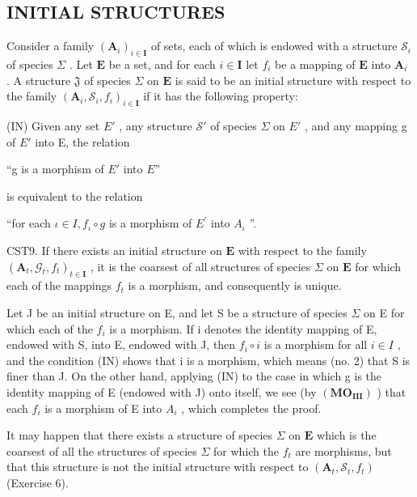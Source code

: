 \subsection{INITIAL STRUCTURES}

Consider a family \((\mathbf{A}_i)_{i\in \mathbf{I}}\) of sets, each of which is endowed with a structure \(\mathcal{S}_i\) of species \(\Sigma\) . Let \(\mathbf{E}\) be a set, and for each \(i\in \mathbf{I}\) let \(f_i\) be a mapping of \(\mathbf{E}\) into \(\mathbf{A}_i\) . A structure \(\mathfrak{J}\) of species \(\Sigma\) on \(\mathbf{E}\) is said to be an initial structure with respect to the family \((\mathbf{A}_i,\mathcal{S}_i,f_i)_{i\in \mathbf{I}}\) if it has the following property:

(IN) Given any set \(E'\) , any structure \(\mathcal{S}'\) of species \(\Sigma\) on \(E'\) , and any mapping g of \(E'\) into E, the relation

``g is a morphism of \(E'\) into \(E\)''

is equivalent to the relation

``for each \(\iota\in I,f_{\iota}\circ g\) is a morphism of \(E^{\prime}\) into \(A_{\iota}\) ''.

CST9. If there exists an initial structure on \(\mathbf{E}\) with respect to the family \((\mathbf{A}_t, \mathcal{G}_t, f_t)_{t \in \mathbf{I}}\) , it is the coarsest of all structures of species \(\Sigma\) on \(\mathbf{E}\) for which each of the mappings \(f_t\) is a morphism, and consequently is unique.

Let J be an initial structure on E, and let S be a structure of species \(\Sigma\) on E for which each of the \(f_{i}\) is a morphism. If i denotes the identity mapping of E, endowed with S, into E, endowed with J, then \(f_{i} \circ i\) is a morphism for all \(i \in I\) , and the condition (IN) shows that i is a morphism, which means (no. 2) that S is finer than J. On the other hand, applying (IN) to the case in which g is the identity mapping of E (endowed with J) onto itself, we see (by \((\mathbf{MO}_{\mathbf{III}})\) ) that each \(f_{i}\) is a morphism of E into \(A_{i}\) , which completes the proof.

It may happen that there exists a structure of species \(\Sigma\) on \(\mathbf{E}\) which is the coarsest of all the structures of species \(\Sigma\) for which the \(f_{t}\) are morphisms, but that this structure is not the initial structure with respect to \((\mathbf{A}_{t},\mathcal{S}_{t},f_{t})\) (Exercise 6).

